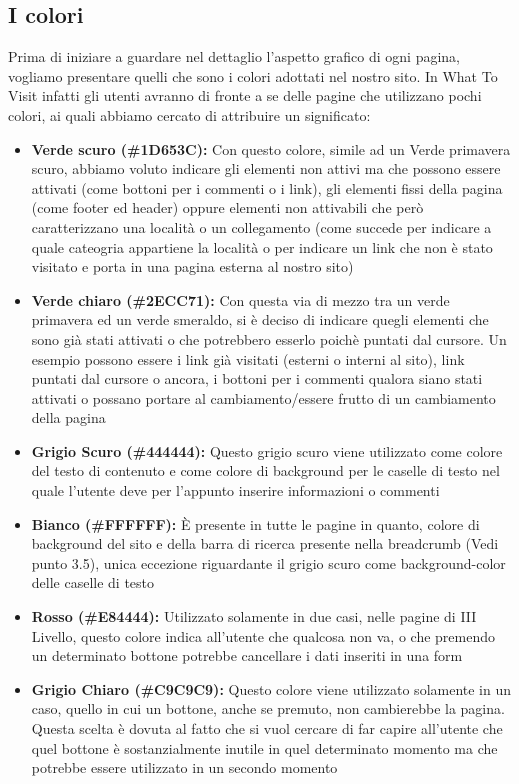 \subsection{I colori}
Prima di iniziare a guardare nel dettaglio l'aspetto grafico di ogni pagina, vogliamo presentare quelli che sono i colori adottati nel nostro sito. In What To Visit infatti gli utenti avranno di fronte a se delle pagine che utilizzano pochi colori, ai quali abbiamo cercato di attribuire un significato:
\begin{itemize}
\item \textbf{Verde scuro (\#1D653C):} Con questo colore, simile ad un Verde primavera scuro, abbiamo voluto indicare gli elementi non attivi ma che possono essere attivati (come bottoni per i commenti o i link), gli elementi fissi della pagina (come footer ed header) oppure elementi non attivabili che però caratterizzano una località o un collegamento (come succede per indicare a quale cateogria appartiene la località o per indicare un link che non è stato visitato e porta in una pagina esterna al nostro sito)
\item \textbf{Verde chiaro (\#2ECC71):} Con questa via di mezzo tra un verde primavera ed un verde smeraldo, si è deciso di indicare quegli elementi che sono già stati attivati o che potrebbero esserlo poichè puntati dal cursore. Un esempio possono essere i link già visitati (esterni o interni al sito), link puntati dal cursore o ancora, i bottoni per i commenti qualora siano stati attivati o possano portare al cambiamento/essere frutto di un cambiamento della pagina
\item \textbf{Grigio Scuro (\#444444):} Questo grigio scuro viene utilizzato come colore del testo di contenuto e come colore di background per le caselle di testo nel quale l'utente deve per l'appunto inserire informazioni o commenti
\item \textbf{Bianco (\#FFFFFF):} È presente in tutte le pagine in quanto, colore di background del sito e della barra di ricerca presente nella breadcrumb (Vedi punto 3.5), unica eccezione riguardante il grigio scuro come background-color delle caselle di testo
\item \textbf{Rosso (\#E84444):} Utilizzato solamente in due casi, nelle pagine di III Livello, questo colore indica all'utente che qualcosa non va, o che premendo un determinato bottone potrebbe cancellare i dati inseriti in una form
\item \textbf{Grigio Chiaro (\#C9C9C9):} Questo colore viene utilizzato solamente in un caso, quello in cui un bottone, anche se premuto, non cambierebbe la pagina. Questa scelta è dovuta al fatto che si vuol cercare di far capire all'utente che quel bottone è sostanzialmente inutile in quel determinato momento ma che potrebbe essere utilizzato in un secondo momento
\end{itemize}

